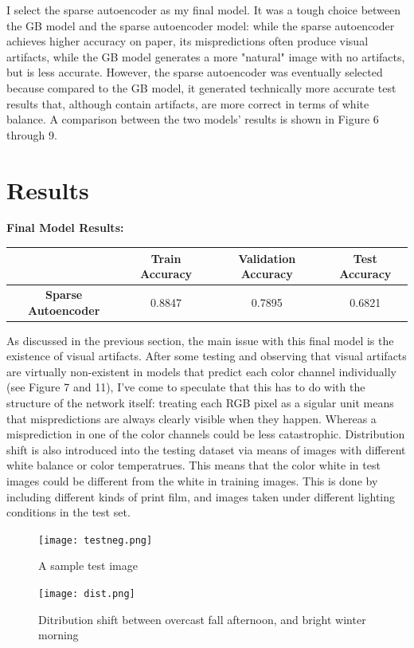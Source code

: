 \documentclass[twoside,11pt]{article}
\begin{document}
I select the sparse autoencoder as my final model. It was a tough choice between the GB model and the sparse autoencoder model: while the sparse autoencoder achieves higher 
accuracy on paper, its mispredictions often produce visual artifacts, while the GB model generates a more "natural" image 
with no artifacts, but is less accurate. However, the sparse autoencoder was eventually selected because 
compared to the GB model, it generated technically more accurate test results that, although contain artifacts, are more correct in terms of white balance. 
A comparison between the two models' results is shown in Figure 6 through 9.

\section{Results}
\label{sec:results}

\textbf{Final Model Results:}
\begin{center}
	\begin{tabular}{ c|c|c|c }
	 &  \textbf{Train Accuracy}& \textbf{Validation Accuracy} & \textbf{Test Accuracy} \\
	 \hline
	 \textbf{Sparse Autoencoder} & 0.8847 & 0.7895 & 0.6821 \\  
	\end{tabular}
	\end{center}

As discussed in the previous section, the main issue with this final model is the existence of visual artifacts. 
After some testing and observing that visual artifacts are virtually non-existent in models that 
predict each color channel individually (see Figure 7 and 11), 
I've come to speculate that this has to do with the structure of the network itself: treating each 
RGB pixel as a sigular unit means that mispredictions are always clearly visible when they happen. 
Whereas a misprediction in one of the color channels could be less catastrophic.
Distribution shift is also introduced into the testing dataset via means of images with different
 white balance or color temperatrues. This means that the color white in test images could be different from 
 the white in training images. This is done by including different kinds of print film, and images taken under different 
 lighting conditions in the test set.

\begin{figure}
	\centering
	\texttt{[image: testneg.png]}
	\caption{A sample test image}
	\texttt{[image: dist.png]}
	\caption{Ditribution shift between overcast fall afternoon, and bright winter morning}
	\label{fig:test}
\end{figure}
\end{document}

